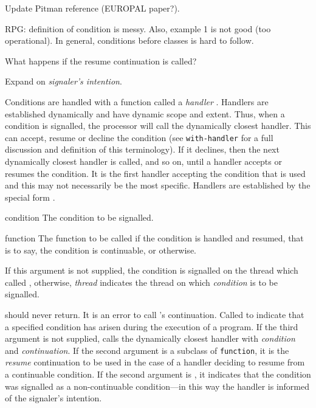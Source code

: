\label{cond-hand}
%
\begin{optPrivate}
    Update Pitman reference (EUROPAL paper?).

    RPG: definition of condition is messy.  Also, example 1 is not good (too
    operational).  In general, conditions before classes is hard to follow.

    What happens if the resume continuation \nil\/ is called?

    Expand on {\em signaler's intention}.
\end{optPrivate}
%
\begin{optDefinition}
%
Conditions are handled with a function called a {\em handler}
.  Handlers are established dynamically and have
dynamic scope and extent.  Thus, when a condition is signalled, the processor
will call the dynamically closest handler.  This can accept, resume or decline
the condition (see {\tt with-handler} for a full discussion and definition of
this terminology).  If it declines, then the next dynamically closest handler is
called, and so on, until a handler accepts or resumes the condition.  It is the
first handler accepting the condition that is used and this may not necessarily
be the most specific.  Handlers are established by the special form
.

%
\begin{arguments}
    \item[condition] The condition to be signalled.

    \item[function] The function to be called if the condition is handled and
    resumed, that is to say, the condition is continuable, or \nil
    otherwise.

    \item[\optional{thread}] If this argument is not supplied, the condition is
    signalled on the thread which called , otherwise, {\em
        thread} indicates the thread on which {\em condition} is to be
    signalled.
\end{arguments}
%
\result%
 should never return.  It is an error to call
's continuation.
%
\remarks%
Called to indicate that a specified condition has arisen during the execution of
a program.
%
If the third argument is not supplied,  calls the
dynamically closest handler with {\em condition} and {\em continuation}.  If the
second argument is a subclass of {\tt function}, it is the {\em resume}
continuation to be used in the case of a handler deciding to resume from a
continuable condition.  If the second argument is \nil, it indicates that the
condition was signalled as a non-continuable condition---in this way the handler
is informed of the signaler's intention.


\end{optDefinition}
